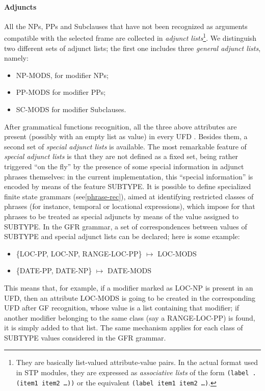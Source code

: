 \paragraph{Adjuncts}

All the NPs, PPs and Subclauses that have not been recognized as arguments
compatible with the selected frame are collected in {\em adjunct
lists}\footnote{They are basically list-valued attribute-value pairs. In the
actual format used in STP modules, they are expressed as {\em
associative lists} of the form
{\tt (label . (item1 item2 \dots))} or the equivalent {\tt (label item1 item2
\dots)}.}. We distinguish two different sets of adjunct lists; the first one
includes three {\em general adjunct lists}, namely:

\begin{itemize}
\item NP-MODS, for modifier NPs;
\item PP-MODS for modifier PPs;
\item SC-MODS for modifier Subclauses.
\end{itemize}

After grammatical functions recognition, all the three above attributes are
present (possibly with an empty list as value) in every UFD . Besides them, a
second set of {\em special adjunct lists} is available. The most remarkable
feature of {\em special adjunct lists} is that they are not defined as a fixed
set, being rather triggered ``on the fly'' by the presence of some special
information in adjunct phrases themselves: in the current implementation, this
``special information'' is encoded by means of the feature SUBTYPE.  It is
possible to define specialized finite state grammars (see\ref{phrase-rec}),
aimed at identifying restricted classes of phrases (for instance, temporal or
locational expressions), which impose for that phrases to be treated as special
adjuncts by means of the value assigned to SUBTYPE. In the GFR grammar,
a set of
correspondences between values of SUBTYPE and special adjunct lists can be
declared; here is some example:

\begin{itemize}
\item \{LOC-PP, LOC-NP, RANGE-LOC-PP\} $\mapsto$ LOC-MODS
\item \{DATE-PP, DATE-NP\}  $\mapsto$ DATE-MODS
\end{itemize}

This means that, for example, if a modifier marked as LOC-NP is present in an
UFD, then an attribute LOC-MODS is going to be created in the corresponding UFD
after GF recognition, whose value is a list containing that modifier;
if another 
modifier belonging to the same class (say a RANGE-LOC-PP) is found, it
is simply
added to that list. The same mechanism applies for each class of SUBTYPE values
considered in the GFR grammar.


